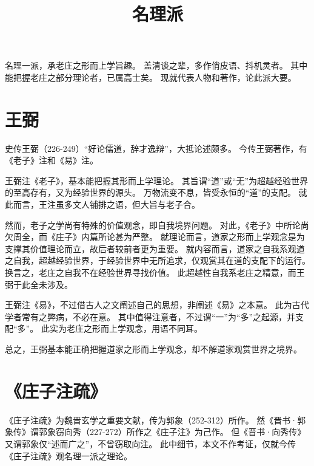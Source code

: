 \documentclass[11pt]{article}
\title{名理派}
\date{}
\begin{document}
  \maketitle

  \linenumbers

名理一派，承老庄之形而上学旨趣。
盖清谈之辈，多作俏皮语、抖机灵者。
其中能把握老庄之部分理论者，已属高士矣。
现就代表人物和著作，论此派大要。

\section{王弼}
史传王弼（226-249）“好论儒道，辞才逸辩”，大抵论述颇多。
今传王弼著作，有《老子》注和《易》注。

\newline

王弼注《老子》，基本能把握其形而上学理论。
其旨谓“道”或“无”为超越经验世界的至高存有，又为经验世界的源头。
万物流变不息，皆受永恒的“道”的支配。
就此而言，王注虽多文人铺排之语，但大旨与老子合。

\newline

然而，老子之学尚有特殊的价值观念，即自我境界问题。
对此，《老子》中所论尚欠周全，而《庄子》内篇所论甚为严整。
就理论而言，道家之形而上学观念是为支撑其价值理论而立，故后者较前者更为重要。
就内容而言，道家之自我系观道之自我，超越经验世界，于经验世界中无所追求，仅观赏其在道的支配下的运行。
换言之，老庄之自我不在经验世界寻找价值。
此超越性自我系老庄之精意，而王弼于此全未涉及。

\newline

王弼注《易》，不过借古人之文阐述自己的思想，非阐述《易》之本意。
此为古代学者常有之弊病，不必在意。
其中值得注意者，不过谓“一”为“多”之起源，并支配“多”。
此实为老庄之形而上学观念，用语不同耳。

\newline

总之，王弼基本能正确把握道家之形而上学观念，却不解道家观赏世界之境界。

\section{《庄子注疏》}
《庄子注疏》为魏晋玄学之重要文献，传为郭象（252-312）所作。
然《晋书·郭象传》谓郭象窃向秀（227-272）所作之《庄子注》为己作。
但《晋书·向秀传》又谓郭象仅“述而广之”，不曾窃取向注。
此中细节，本文不作考证，仅就今传《庄子注疏》观名理一派之理论。

\newline
\end{document}
